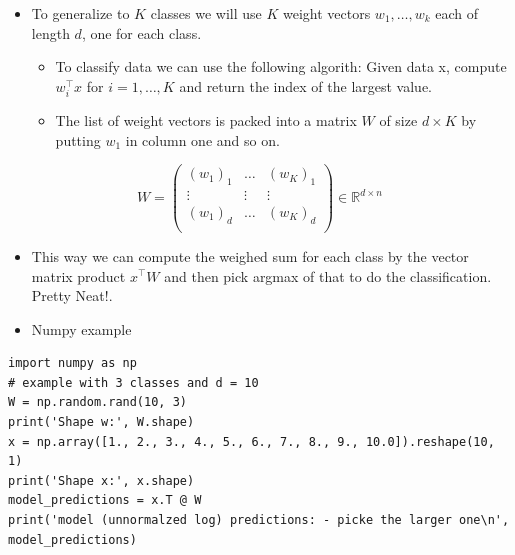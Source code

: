 \documentclass[11pt]{article}
\begin{document}
\begin{itemize}
\item To generalize to \(K\) classes we will use \(K\) weight vectors \(w_1,\dots,w_k\) each of length \(d\), one for each class.
\begin{itemize}
\item To classify data we can use the following algorith: Given data x, compute \(w_i^\intercal x\) for \(i=1,\dots, K\) and return the index of the largest value.
\item The list of weight vectors is packed into a matrix \(W\) of size \(d \times K\) by putting \(w_1\) in column one and so on.
\end{itemize}
\end{itemize}
$$
W=\begin{pmatrix} 
(w_1)_1  & \dots & (w_K)_1 \\
\vdots & \vdots & \vdots \\
(w_1)_d  & \dots & (w_K)_d \\
\end{pmatrix}\in \mathbb{R}^{d \times n}
$$
\begin{itemize}
\item This way we can compute the weighed sum for each class by the vector matrix product \(x^\intercal W\) and then pick argmax of that to do the classification. Pretty Neat!.

\item Numpy example
\end{itemize}
\begin{verbatim}
import numpy as np
# example with 3 classes and d = 10
W = np.random.rand(10, 3)
print('Shape w:', W.shape)
x = np.array([1., 2., 3., 4., 5., 6., 7., 8., 9., 10.0]).reshape(10, 1)
print('Shape x:', x.shape)
model_predictions = x.T @ W
print('model (unnormalzed log) predictions: - picke the larger one\n', model_predictions)
\end{verbatim}
\end{document}
